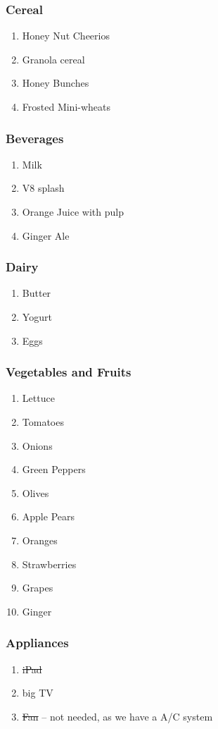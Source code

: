 \begin{frame}
\frametitle{Cereal} 
\begin{enumerate} 
\item Honey Nut Cheerios 
\item Granola cereal
\item Honey Bunches 
\item Frosted Mini-wheats
\end{enumerate} 
\end{frame} 

\begin{frame} 
\frametitle{Beverages} 
\begin{enumerate}
\item Milk
\item V8 splash 
\item Orange Juice with pulp
\item Ginger Ale 
\end{enumerate} 
\end{frame}  

\begin{frame} 
\frametitle{Dairy} 
\begin{enumerate}
\item Butter
\item Yogurt
\item Eggs
\end{enumerate}
\end{frame} 

\begin{frame} 
\frametitle{Vegetables and Fruits} 
\begin{enumerate}
\item Lettuce
\item Tomatoes
\item Onions
\item Green Peppers
\item Olives
\item Apple Pears
\item Oranges
\item Strawberries
\item Grapes
\item Ginger
\end{enumerate}
\end{frame}

\begin{frame} 
\frametitle{Appliances} 
\begin{enumerate}
\item \small \sout{iPad}
\item \small big TV
\item \small \sout{Fan} -- not needed, as we have a A/C system
\end{enumerate}
\end{frame} 


